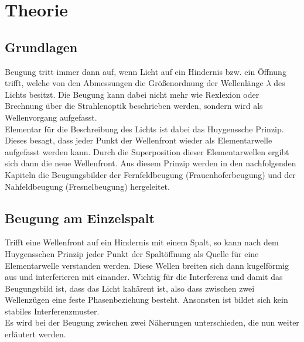\section{Theorie}
\label{sec:Theorie}
\subsection{Grundlagen}
\label{sec:grundlagen}
Beugung tritt immer dann auf, wenn Licht auf ein Hindernis bzw. ein Öffnung trifft, welche von den Abmessungen die Größenordnung der Wellenlänge $\lambda$ des Lichts
besitzt. Die Beugung kann dabei nicht mehr wie Rexlexion oder Brechnung über die Strahlenoptik beschrieben werden, sondern wird als Wellenvorgang
aufgefasst.
\\\noindent
Elementar für die Beschreibung des Lichts ist dabei das Huygenssche Prinzip. Dieses besagt, dass jeder Punkt der Wellenfront wieder als Elementarwelle
aufgefasst werden kann. Durch die Superposition dieser Elementarwellen ergibt sich dann die neue Wellenfront. Aus diesem Prinzip werden in den nachfolgenden
Kapiteln die Beugungsbilder der Fernfeldbeugung (Frauenhoferbeugung) und der Nahfeldbeugung (Fresnelbeugung) hergeleitet. 

\subsection{Beugung am Einzelspalt}
\label{sec:einzel}
Trifft eine Wellenfront auf ein Hindernis mit einem Spalt, so kann nach dem Huygensschen Prinzip jeder Punkt der Spaltöffnung als Quelle für eine Elementarwelle
verstanden werden. Diese Wellen breiten sich dann kugelförmig aus und interferieren mit einander. Wichtig für die Interferenz und damit das Beugungsbild ist,
dass das Licht kahärent ist, also dass zwischen zwei Wellenzügen eine feste Phasenbeziehung besteht. Ansonsten ist bildet sich kein stabiles Interferenzmuster.
\\\noindent
Es wird bei der Beugung zwischen zwei Näherungen unterschieden, 
die nun weiter erläutert werden.

